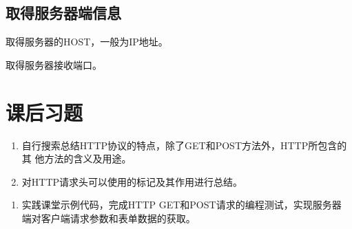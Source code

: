 \subsection{取得服务器端信息} 

 取得服务器的HOST，一般为IP地址。

 取得服务器接收端口。

\section{课后习题}


\begin{enumerate}
\item 自行搜索总结HTTP协议的特点，除了GET和POST方法外，HTTP所包含的其
  他方法的含义及用途。
\item 对HTTP请求头可以使用的标记及其作用进行总结。
\end{enumerate}

\begin{enumerate}
\item 实践课堂示例代码，完成HTTP GET和POST请求的编程测试，实现服务器
  端对客户端请求参数和表单数据的获取。
\end{enumerate}